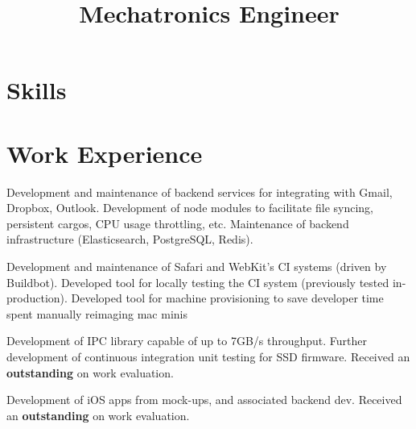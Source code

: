 \documentclass[11pt,a4paper]{moderncv}
\title{Mechatronics Engineer}               %
\begin{document}
\maketitle

\vspace{-13mm}

\section{Skills}


\section{Work Experience}
{ Development and maintenance of backend services for integrating with Gmail, Dropbox, Outlook.
    \newline{} Development of node modules to facilitate file syncing, persistent cargos, CPU usage throttling, etc.
    \newline{} Maintenance of backend infrastructure (Elasticsearch, PostgreSQL, Redis).}

{Development and maintenance of Safari and WebKit's CI systems (driven by Buildbot).
    \newline{}Developed tool for locally testing the CI system (previously tested in-production).
\newline{}Developed tool for machine provisioning to save developer time spent manually reimaging mac minis}

{Development of IPC library capable of up to 7GB/s throughput.
    \newline{}Further development of continuous integration unit testing for SSD firmware.
\newline{}Received an \textbf{outstanding} on work evaluation.}

{Development of iOS apps from mock-ups, and associated backend dev.
\newline{}Received an \textbf{outstanding} on work evaluation.}
\end{document}
